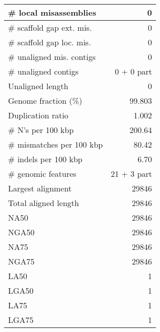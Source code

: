 \documentclass[12pt,a4paper]{article}
\begin{document}
\begin{table}[ht]
\begin{center}
\begin{tabular}{|l*{1}{|r}|}
\# local misassemblies & 0 \\ \hline
\# scaffold gap ext. mis. & 0 \\ \hline
\# scaffold gap loc. mis. & 0 \\ \hline
\# unaligned mis. contigs & 0 \\ \hline
\# unaligned contigs & 0 + 0 part \\ \hline
Unaligned length & 0 \\ \hline
Genome fraction (\%) & 99.803 \\ \hline
Duplication ratio & 1.002 \\ \hline
\# N's per 100 kbp & 200.64 \\ \hline
\# mismatches per 100 kbp & 80.42 \\ \hline
\# indels per 100 kbp & 6.70 \\ \hline
\# genomic features & 21 + 3 part \\ \hline
Largest alignment & 29846 \\ \hline
Total aligned length & 29846 \\ \hline
NA50 & 29846 \\ \hline
NGA50 & 29846 \\ \hline
NA75 & 29846 \\ \hline
NGA75 & 29846 \\ \hline
LA50 & 1 \\ \hline
LGA50 & 1 \\ \hline
LA75 & 1 \\ \hline
LGA75 & 1 \\ \hline
\end{tabular}
\end{center}
\end{table}
\end{document}
